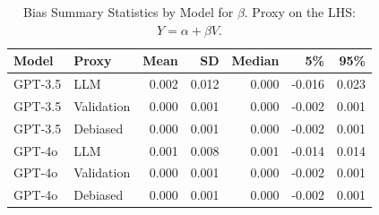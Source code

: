 \begin{table}

\caption{Bias Summary Statistics by Model for $\beta$. Proxy on the LHS: $Y = \alpha + \beta V$.}
\centering
\begin{tabular}[t]{llrrrrr}
\toprule
Model & Proxy & Mean & SD & Median & 5\% & 95\%\\
\midrule
GPT-3.5 & LLM & 0.002 & 0.012 & 0.000 & -0.016 & 0.023\\
GPT-3.5 & Validation & 0.000 & 0.001 & 0.000 & -0.002 & 0.001\\
GPT-3.5 & Debiased & 0.000 & 0.001 & 0.000 & -0.002 & 0.001\\
GPT-4o & LLM & 0.001 & 0.008 & 0.001 & -0.014 & 0.014\\
GPT-4o & Validation & 0.000 & 0.001 & 0.000 & -0.002 & 0.001\\
GPT-4o & Debiased & 0.000 & 0.001 & 0.000 & -0.002 & 0.001\\
\bottomrule
\end{tabular}
\end{table}
